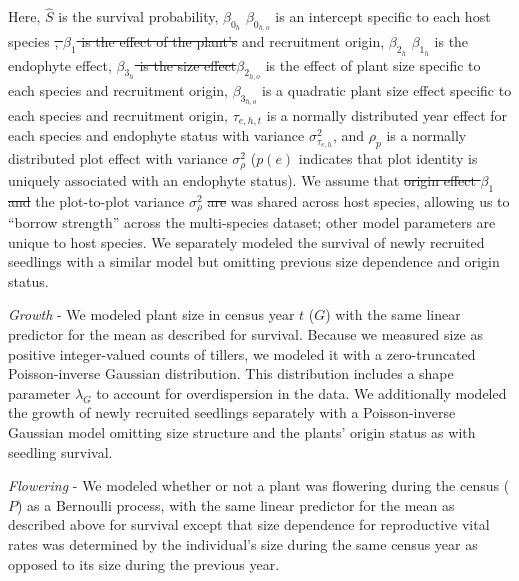 \documentclass[lineno, sn-basic]{sn-jnl}%
\providecommand{\DIFadd}[1]{{\protect\color{blue}#1}} %
\providecommand{\DIFdel}[1]{{\protect\color{red}\protect\scriptsize\sout{#1}}}
\providecommand{\DIFadd}[1]{{\protect\color{blue}\uwave{#1}}} %
\providecommand{\DIFdel}[1]{{\protect\color{red}\sout{#1}}}                      %
\providecommand{\DIFaddbegin}{} %
\providecommand{\DIFaddend}{} %
\providecommand{\DIFdelbegin}{} %
\providecommand{\DIFdelend}{} %
\newcommand{\DIFscaledelfig}{0.5}
\newlength{\DIFdelgraphicswidth} %
\newlength{\DIFdelgraphicsheight} %
\newcommand{\DIFaddincludegraphics}[2][]{{\color{blue}\fbox{\DIFOincludegraphics[#1]{#2}}}} %
\newcommand{\DIFdelincludegraphics}[2][]{%
\sbox{\DIFdelgraphicsbox}{\DIFOincludegraphics[#1]{#2}}%
\settoboxwidth{\DIFdelgraphicswidth}{\DIFdelgraphicsbox} %
\settoboxtotalheight{\DIFdelgraphicsheight}{\DIFdelgraphicsbox} %
\scalebox{\DIFscaledelfig}{%
\parbox[b]{\DIFdelgraphicswidth}{\usebox{\DIFdelgraphicsbox}\\[-\baselineskip] \rule{\DIFdelgraphicswidth}{0em}}\llap{\resizebox{\DIFdelgraphicswidth}{\DIFdelgraphicsheight}{%
\setlength{\unitlength}{\DIFdelgraphicswidth}%
\begin{picture}(1,1)%
\thicklines\linethickness{2pt} %
{\color[rgb]{1,0,0}\put(0,0){\framebox(1,1){}}}%
{\color[rgb]{1,0,0}\put(0,0){\line( 1,1){1}}}%
{\color[rgb]{1,0,0}\put(0,1){\line(1,-1){1}}}%
\end{picture}%
}\hspace*{3pt}}} %
} %
\DeclareRobustCommand{\DIFaddbegin}{\DIFOaddbegin \let\includegraphics\DIFaddincludegraphics} %
\DeclareRobustCommand{\DIFaddend}{\DIFOaddend \let\includegraphics\DIFOincludegraphics} %
\DeclareRobustCommand{\DIFdelbegin}{\DIFOdelbegin \let\includegraphics\DIFdelincludegraphics} %
\DeclareRobustCommand{\DIFdelend}{\DIFOaddend \let\includegraphics\DIFOincludegraphics} %
\begin{document}
Here, $\hat{S}$ is the survival probability, \DIFdelbegin \DIFdel{$\beta_{0_{h}}$ }\DIFdelend \DIFaddbegin \DIFadd{$\beta_{0_{h,o}}$ }\DIFaddend is an intercept specific to each host species \DIFdelbegin \DIFdel{, $\beta_1$ is the effect of the plant's }\DIFdelend \DIFaddbegin \DIFadd{and }\DIFaddend recruitment origin, \DIFdelbegin \DIFdel{$\beta_{2_{h}}$ }\DIFdelend \DIFaddbegin \DIFadd{$\beta_{1_{h}}$ }\DIFaddend is the endophyte effect, \DIFdelbegin \DIFdel{$\beta_{3_{h}}$ is the size effect}\DIFdelend \DIFaddbegin \DIFadd{$\beta_{2_{h,o}}$ is the effect of plant size specific to each species and recruitment origin, $\beta_{3_{h,o}}$ is a quadratic plant size effect specific to each species and recruitment origin}\DIFaddend , $\tau_{e,h,t}$ is a normally distributed year effect for each species and endophyte status with variance $\sigma^2_{\tau_{e,h}}$, and $\rho_{p}$ is a normally distributed plot effect with variance $\sigma^2_{\rho}$ ($p(e)$ indicates that plot identity is uniquely associated with an endophyte status).
We assume that \DIFdelbegin \DIFdel{origin effect $\beta_1$ and }\DIFdelend \DIFaddbegin \DIFadd{the }\DIFaddend plot-to-plot variance $\sigma^2_{\rho}$ \DIFdelbegin \DIFdel{are }\DIFdelend \DIFaddbegin \DIFadd{was }\DIFaddend shared across host species, allowing us to ``borrow strength'' across the multi-species dataset; other model parameters are unique to host species. 
We separately modeled the survival of newly recruited seedlings with a similar model but omitting previous size dependence and origin status. 


\emph{Growth} - We modeled plant size in census year $t$ ($G$) with the same linear predictor for the mean as described for survival.
Because we measured size as positive integer-valued counts of tillers, we modeled it with a zero-truncated Poisson-inverse Gaussian distribution.
This distribution includes a shape parameter $\lambda_G$ to account for overdispersion in the data.
We additionally modeled the growth of newly recruited seedlings separately with a Poisson-inverse Gaussian model omitting size structure and the plants' origin status as with seedling survival.

\emph{Flowering} - We modeled whether or not a plant was flowering during the census ($P$) as a Bernoulli process, with the same linear predictor for the mean as described above for survival except that size dependence for reproductive vital rates was determined by the individual's size during the same census year as opposed to its size during the previous year.
\end{document}
